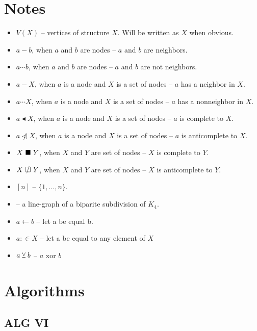 

\author{Adrian Siwiec}
\date{\today{}}


\section{Notes}
\begin{itemize}
	\item $V(X)$ -- vertices of structure $X$. Will be written as $X$ when obvious.
	\item $a - b$, when $a$ and $b$ are nodes -- $a$ and $b$ are neighbors.
	\item $a \cdots b$, when $a$ and $b$ are nodes -- $a$ and $b$ are not neighbors.
	\item $a - X$, when $a$ is a node and $X$ is a set of nodes -- $a$ has a neighbor in $X$.
	\item $a \cdots X$, when $a$ is a node and $X$ is a set of nodes -- $a$ has a nonneighbor in $X$.
	\item $a \blacktriangleleft  X$, when $a$ is a node and $X$ is a set of nodes -- $a$ is complete to $X$.
	\item $a \ntriangleleft X$, when $a$ is a node and $X$ is a set of nodes -- $a$ is anticomplete to $X$.
	\item $X \ \blacksquare\  Y$, when $X$ and $Y$ are set of nodes -- $X$ is complete to $Y$.
	\item $X \setAntiComplete Y$, when $X$ and $Y$ are set of nodes -- $X$ is anticomplete to $Y$.
	\item $[n]$  -- $\{1, \ldots, n\}$.
	\item \LGBSK -- a line-graph of a biparite subdivision of $K_4$.
	\item $a \gets b$ -- let a be equal b.
	\item $a :\in X$ -- let a be equal to any element of $X$
	\item $a \veebar b$ -- $a$ xor $b$
\end{itemize}
	
\section{Algorithms}
\begin{algorithm}
\end{algorithm}
  

\clearpage


\clearpage
	

\clearpage


\clearpage

\subsection{ALG VI}

\clearpage


\clearpage


\clearpage


\clearpage
	

